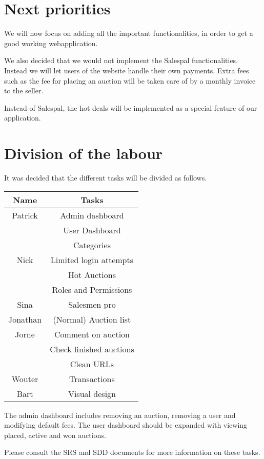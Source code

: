 \documentclass[a4paper, 12pt]{article}
\begin{document}
	\section{Next priorities}
		We will now focus on adding all the important functionalities, in order to get a good working webapplication. 
		
		We also decided that we would not implement the Salespal functionalities. Instead we will let users of the website handle their own payments. Extra fees such as the fee for placing an auction will be taken care of by a monthly invoice to the seller.
		
		Instead of Salespal, the hot deals will be implemented as a special feature of our application.
		
	\section{Division of the labour}
		It was decided that the different tasks will be divided as follows.
		
		\begin{tabular}{c|c}
			\textbf{Name} & \textbf{Tasks} \\
			\hline Patrick & Admin dashboard \\ 
						   & User Dashboard \\ 
						   & Categories \\
			\hline Nick & Limited login attempts \\
						& Hot Auctions \\
						& Roles and Permissions \\
			\hline Sina & Salesmen pro \\
			\hline Jonathan & (Normal) Auction list \\
			\hline Jorne & Comment on auction \\
						 & Check finished auctions \\
						 & Clean URLs \\
			\hline Wouter & Transactions \\
			\hline Bart & Visual design \\
		\end{tabular} 
		
		The admin dashboard includes removing an auction, removing a user and modifying default fees. The user dashboard should be expanded with viewing placed, active and won auctions.
		
		Please consult the SRS and SDD documents for more information on these tasks.
		
\end{document}
